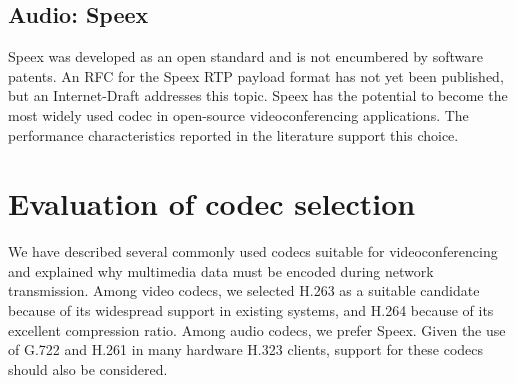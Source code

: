 \subsection{Audio: Speex}\label{kap:Speex}
Speex was developed as an open standard and is not encumbered by software patents. An RFC for the Speex RTP payload format has not yet been published, but an Internet-Draft \cite{IETFDraft-RTP-Payload-Speex} addresses this topic. Speex has the potential to become the most widely used codec in open-source videoconferencing applications. The performance characteristics reported in the literature \cite{Latency-AudioCodecs} support this choice.

\section{Evaluation of codec selection}

We have described several commonly used codecs suitable for videoconferencing and explained why multimedia data must be encoded during network transmission. Among video codecs, we selected H.263 as a suitable candidate because of its widespread support in existing systems, and H.264 because of its excellent compression ratio. Among audio codecs, we prefer Speex. Given the use of G.722 and H.261 in many hardware H.323 clients, support for these codecs should also be considered.

